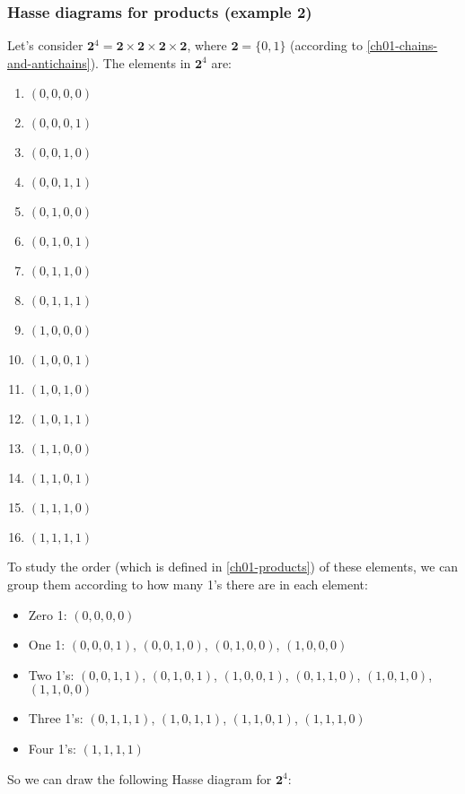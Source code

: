 \documentclass[12pt, letterpaper, oneside]{book}
\begin{document}
\subsubsection{Hasse diagrams for products (example 2)}

Let's consider $\mathbf{2}^4 = \mathbf{2} \times \mathbf{2} \times \mathbf{2} \times \mathbf{2}$, where
$\mathbf{2} = \{0, 1\}$ (according to \ref{ch01-chains-and-antichains}). The elements in $\mathbf{2}^4$ are:
\begin{enumerate}
  \item $(0, 0, 0, 0)$
  \item $(0, 0, 0, 1)$
  \item $(0, 0, 1, 0)$
  \item $(0, 0, 1, 1)$
  \item $(0, 1, 0, 0)$
  \item $(0, 1, 0, 1)$
  \item $(0, 1, 1, 0)$
  \item $(0, 1, 1, 1)$
  \item $(1, 0, 0, 0)$
  \item $(1, 0, 0, 1)$
  \item $(1, 0, 1, 0)$
  \item $(1, 0, 1, 1)$
  \item $(1, 1, 0, 0)$
  \item $(1, 1, 0, 1)$
  \item $(1, 1, 1, 0)$
  \item $(1, 1, 1, 1)$
\end{enumerate}

To study the order (which is defined in \ref{ch01-products}) of these elements, we can group them according to how many
1's there are in each element:
\begin{itemize}
  \item Zero 1: $(0, 0, 0, 0)$
  \item One 1: $(0, 0, 0, 1)$, $(0, 0, 1, 0)$, $(0, 1, 0, 0)$, $(1, 0, 0, 0)$
  \item Two 1's: $(0, 0, 1, 1)$, $(0, 1, 0, 1)$, $(1, 0, 0, 1)$, $(0, 1, 1, 0)$, $(1, 0, 1, 0)$, $(1, 1, 0, 0)$
  \item Three 1's: $(0, 1, 1, 1)$, $(1, 0, 1, 1)$, $(1, 1, 0, 1)$, $(1, 1, 1, 0)$
  \item Four 1's: $(1, 1, 1, 1)$
\end{itemize}

So we can draw the following Hasse diagram for $\mathbf{2}^4$:
\end{document}
